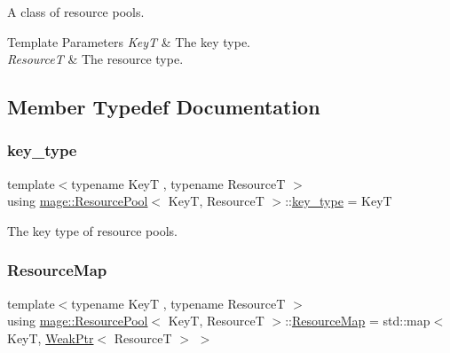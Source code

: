 A class of resource pools.


\begin{DoxyTemplParams}{Template Parameters}
{\em KeyT} & The key type. \\
\hline
{\em ResourceT} & The resource type. \\
\hline
\end{DoxyTemplParams}


\subsection{Member Typedef Documentation}
\mbox{\label{classmage_1_1_resource_pool_adef3060db9bd6ffd8f46abd35afebae5}} 
\subsubsection{\texorpdfstring{key\+\_\+type}{key\_type}}
{\footnotesize\ttfamily template$<$typename KeyT , typename ResourceT $>$ \\
using \mbox{\hyperlink{classmage_1_1_resource_pool}{mage\+::\+Resource\+Pool}}$<$ KeyT, ResourceT $>$\+::\mbox{\hyperlink{classmage_1_1_resource_pool_adef3060db9bd6ffd8f46abd35afebae5}{key\+\_\+type}} =  KeyT}

The key type of resource pools. \mbox{\label{classmage_1_1_resource_pool_a7ae3cfa639bbc3696fa359673fed6153}} 
\subsubsection{\texorpdfstring{Resource\+Map}{ResourceMap}}
{\footnotesize\ttfamily template$<$typename KeyT , typename ResourceT $>$ \\
using \mbox{\hyperlink{classmage_1_1_resource_pool}{mage\+::\+Resource\+Pool}}$<$ KeyT, ResourceT $>$\+::\mbox{\hyperlink{classmage_1_1_resource_pool_a7ae3cfa639bbc3696fa359673fed6153}{Resource\+Map}} =  std\+::map$<$ KeyT, \mbox{\hyperlink{namespacemage_aa159a63c0d58464bdf32dfe419dd5dc1}{Weak\+Ptr}}$<$ ResourceT $>$ $>$\hspace{0.3cm}{\ttfamily [private]}}

